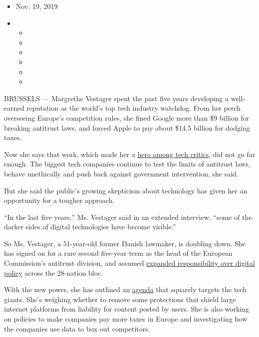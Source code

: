 \begin{itemize}
\item
  Nov. 19, 2019
\item
  \begin{itemize}
  \item
  \item
  \item
  \item
  \item
  \item
  \end{itemize}
\end{itemize}

BRUSSELS --- Margrethe Vestager spent the past five years developing a
well-earned reputation as the world's top tech industry watchdog. From
her perch overseeing Europe's competition rules, she fined Google more
than \$9 billion for breaking antitrust laws, and forced Apple to pay
about \$14.5 billion for dodging taxes.

Now she says that work, which made her a
\href{https://www.nytimes3xbfgragh.onion/2018/05/05/world/europe/margrethe-vestager-silicon-valley-data-privacy.html}{hero
among tech critics}, did not go far enough. The biggest tech companies
continue to test the limits of antitrust laws, behave unethically and
push back against government intervention, she said.

But she said the public's growing skepticism about technology has given
her an opportunity for a tougher approach.

``In the last five years,'' Ms. Vestager said in an extended interview,
``some of the darker sides of digital technologies have become
visible.''

So Ms. Vestager, a 51-year-old former Danish lawmaker, is doubling down.
She has signed on for a rare second five-year term as the head of the
European Commission's antitrust division, and assumed
\href{https://www.nytimes3xbfgragh.onion/2019/09/10/world/europe/margrethe-vestager-european-union-tech-regulation.html}{expanded
responsibility over digital policy} across the 28-nation bloc.

With the new power, she has outlined an
\href{http://www.europarl.europa.eu/RegData/etudes/BRIE/2019/640171/EPRS_BRI(2019)640171_EN.pdf}{agenda}
that squarely targets the tech giants. She's weighing whether to remove
some protections that shield large internet platforms from liability for
content posted by users. She is also working on policies to make
companies pay more taxes in Europe and investigating how the companies
use data to box out competitors.

